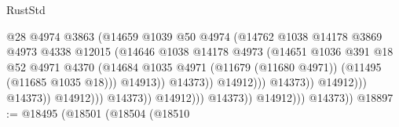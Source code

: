 \begin{lexlean}{RustStd}
\begin{coremodule}
                                                      @28
                                                      @4974
                                                      @3863
                                                      (@14659
                                                        @1039
                                                        @50
                                                        @4974
                                                        (@14762
                                                          @1038
                                                          @14178
                                                          @3869
                                                          @4973
                                                          @4338
                                                          @12015
                                                          (@14646
                                                            @1038
                                                            @14178
                                                            @4973
                                                            (@14651
                                                              @1036
                                                              @391
                                                              @18
                                                              @52
                                                              @4971
                                                              @4370
                                                              (@14684
                                                                @1035
                                                                @4971
                                                                (@11679 (@11680 @4971))
                                                                (@11495 (@11685 @1035 @18)))
                                                              @14913))
                                                          @14373))
                                                      @14912)))
                                                @14373))
                                            @14912)))
                                      @14373))
                                  @14912)))
                            @14373))
                        @14912)))
                  @14373))
              @14912)))
        @14373))
@18897 := @18495
    (@18501
      (@18504
        (@18510

\end{coremodule}
\end{lexlean}
